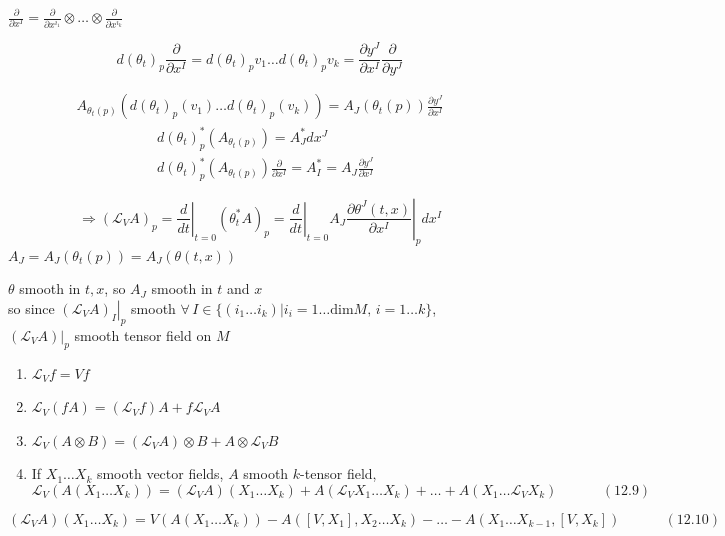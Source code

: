 $\frac{ \partial }{ \partial x^I} = \frac{ \partial }{ \partial x^{i_1} } \otimes \dots \otimes \frac{ \partial }{ \partial x^{i_k} }$

\[
d(\theta_t)_p \frac{ \partial }{ \partial x^I} = d(\theta_t)_pv_1 \dots d(\theta_t)_pv_k =  \frac{ \partial y^J}{ \partial x^I} \frac{ \partial }{ \partial y^J}
\]







\[
\begin{gathered}
  A_{\theta_t(p)}(d(\theta_t)_p(v_1) \dots d(\theta_t)_p(v_k) ) = A_J(\theta_t(p))\frac{ \partial y^J}{ \partial x^I} 
\end{gathered}
\]
\[
\begin{aligned}
  & d(\theta_t)^*_p(A_{\theta_t(p)}) = A^*_J dx^J \\ 
  &  d(\theta_t)^*_p(A_{\theta_t(p)}) \frac{ \partial }{ \partial x^I} = A_I^* = A_J \frac{ \partial y^J}{ \partial x^I }
\end{aligned}
\]

\[
\Longrightarrow ( \mathcal{L}_VA)_p = \left. \frac{d}{dt} \right|_{t=0} (\theta_t^* A)_p = \left. \frac{d}{dt} \right|_{t=0} A_J \left. \frac{ \partial \theta^J(t,x) }{ \partial x^I } \right|_p dx^I
\]
$A_J = A_J(\theta_t(p)) = A_J(\theta(t,x))$

$\theta$ smooth in $t,x$, so $A_J$ smooth in $t$ and $x$  \\

so since $\left. \left( \mathcal{L}_VA\right)_I \right|_p$ smooth $\forall \, I \in \lbrace (i_1 \dots i_k) | i_i = 1 \dots \text{dim}{M}, \, i = 1 \dots k \rbrace$, \\
\quad $\left. (\mathcal{L}_VA)  \right|_p$ smooth tensor field on $M$



\hrulefill


\begin{proposition}[12.32]
  \begin{enumerate}
\item[(a)] $\mathcal{L}_V f = Vf$ 
\item[(b)] $\mathcal{L}_V(fA) = (\mathcal{L}_Vf )A + f\mathcal{L}_VA$
\item[(c)] $\mathcal{L}_V(A\otimes B) = (\mathcal{L}_VA) \otimes B + A \otimes \mathcal{L}_V B$ 
\item[(d)] If $X_1 \dots X_k$ smooth vector fields, $A$ smooth $k$-tensor field, 
\begin{equation}
  \mathcal{L}_V(A(X_1 \dots X_k)) = (\mathcal{L}_VA)(X_1 \dots X_k) + A(\mathcal{L}_VX_1 \dots X_k) + \dots + A(X_1 \dots \mathcal{L}_VX_k) \quad \quad \quad \, (12.9)
\end{equation}
\end{enumerate}

\end{proposition}

\begin{corollary}[12.33]
\begin{equation}
  (\mathcal{L}_VA)(X_1 \dots X_k) = V(A(X_1 \dots X_k))  - A([V,X_1], X_2 \dots X_k) - \dots - A(X_1 \dots X_{k-1}, [V,X_k]) \quad \quad \quad \, (12.10)
\end{equation}
\end{corollary}
